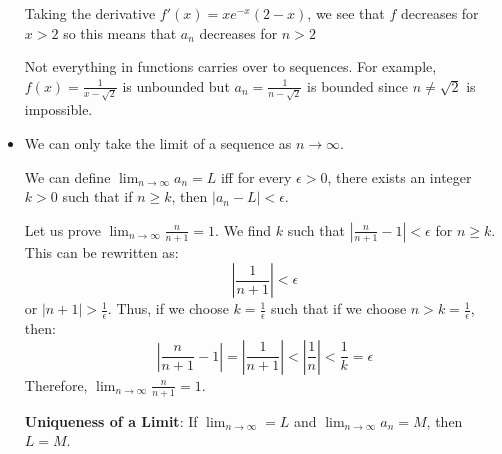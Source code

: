 \begin{itemize}
\begin{example}
\begin{center}
        \end{center}
        Taking the derivative $f'(x)=xe^{-x}(2-x)$, we see that $f$ decreases for $x>2$ so this means that $a_n$ decreases for $n>2$
    \end{example}
    \begin{warning}
        Not everything in functions carries over to sequences. For example, $f(x)=\frac{1}{x-\sqrt{2}}$ is unbounded but $a_n = \frac{1}{n-\sqrt{2}}$ is bounded since $n \neq \sqrt{2}$ is impossible.
    \end{warning}
    \item We can only take the limit of a sequence as $n\to\infty$.
    \begin{definition}
        We can define $\lim_{n\to\infty} a_n = L$ iff for every $\epsilon>0$, there exists an integer $k>0$ such that if $n \ge k$, then $|a_n - L| < \epsilon$.
    \end{definition}
    \begin{example}
        Let us prove $\lim_{n\to\infty} \frac{n}{n+1}=1$. We  find $k$ such that $\left|\frac{n}{n+1}-1\right|<\epsilon$ for $n\ge k$. This can be rewritten as:
        \begin{equation}
            \left|\frac{1}{n+1}\right| < \epsilon 
        \end{equation}
        or $|n+1| > \frac{1}{\epsilon}$. Thus, if we choose $k = \frac{1}{\epsilon}$ such that if we choose $n>k=\frac{1}{\epsilon}$, then:
        \begin{equation}
            \left|\frac{n}{n+1}-1\right| = \left|\frac{1}{n+1}\right| < \left|\frac{1}{n}\right| < \frac{1}{k} = \epsilon
        \end{equation}
        Therefore, $\lim_{n\to\infty} \frac{n}{n+1}=1$.
    \end{example}
    \begin{theorem}
        \textbf{Uniqueness of a Limit}: If $\lim_{n\to\infty} = L$ and $\lim_{n\to\infty}a_n = M$, then $L=M$.

\end{theorem}
\end{itemize}
